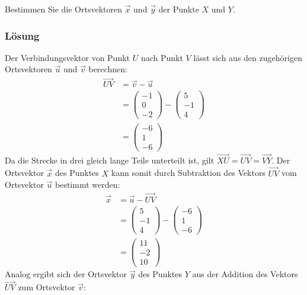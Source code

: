 Bestimmen Sie die Ortsvektoren $\vec{x}$ und $\vec{y}$ der Punkte $X$ und $Y$.

\subsubsection{Lösung}
Der Verbindungsvektor von Punkt $U$ nach Punkt $V$ lässt sich aus den zugehörigen Ortsvektoren $\vec{u}$ und $\vec{v}$ berechnen:
\begin{align*}
    \vec{UV} &= \vec{v} - \vec{u} \\
    &= \begin{pmatrix}
        -1 \\ 0 \\ -2
    \end{pmatrix} - \begin{pmatrix}
        5 \\ -1 \\ 4
    \end{pmatrix} \\
    &= \begin{pmatrix}
        -6 \\ 1 \\ -6
    \end{pmatrix}
\end{align*}
Da die Strecke in drei gleich lange Teile unterteilt ist, gilt $\vec{XU} = \vec{UV} = \vec{VY}$.
\newline
\newline
Der Ortsvektor $\vec{x}$ des Punktes $X$ kann somit durch Subtraktion des Vektors $\vec{UV}$ vom Ortsvektor $\vec{u}$ bestimmt werden:
\begin{align*}
    \vec{x} &= \vec{u} - \vec{UV} \\
    &= \begin{pmatrix}
        5 \\ -1 \\ 4
    \end{pmatrix} - \begin{pmatrix}
        -6 \\ 1 \\ -6
    \end{pmatrix} \\
    &= \begin{pmatrix}
        11 \\ -2 \\ 10
    \end{pmatrix}
\end{align*}
Analog ergibt sich der Ortsvektor $\vec{y}$ des Punktes $Y$ aus der Addition des Vektors $\vec{UV}$ zum Ortsvektor $\vec{v}$:
